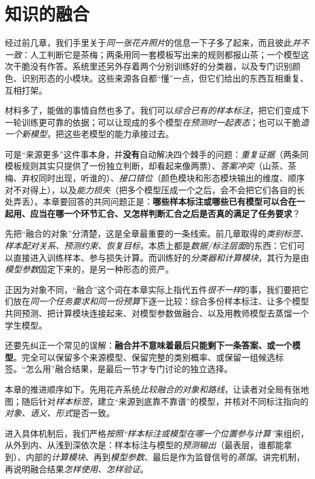 \chapter{知识的融合}
\label{chap:knowledge-fusion}

经过前几章，我们手里关于\emph{同一张花卉照片}的信息一下子多了起来，而且彼此\emph{并不一致}：人工判断它是茶梅；两条用同一套模板写出来的规则都报山茶；一个模型这次干脆没有作答。系统里还另外存着两个分别训练好的分类器，以及专门识别颜色、识别形态的小模块。这些来源各自都“懂”一点，但它们给出的东西互相重复、互相打架。

材料多了，能做的事情自然也多了。我们可以\emph{综合已有的样本标注}，把它们变成下一轮训练更可靠的依据；可以让现成的多个模型\emph{在预测时一起表态}；也可以干脆\emph{造一个新模型}，把这些老模型的能力承接过去。

可是“来源更多”这件事本身，并\textbf{没有}自动解决四个棘手的问题：\emph{重复证据}（两条同模板规则其实只提供了一份独立判断，却看起来像两票）、\emph{答案冲突}（山茶、茶梅、弃权同时出现，听谁的）、\emph{接口错位}（颜色模块和形态模块输出的维度、顺序对不对得上），以及\emph{能力损失}（把多个模型压成一个之后，会不会把它们各自的长处弄丢）。本章要回答的共同问题正是：\textbf{哪些样本标注或哪些已有模型可以合在一起用、应当在哪一个环节汇合、又怎样判断汇合之后是否真的满足了任务要求}？

先把“融合的对象”分清楚，这是全章最重要的一条线索。前几章取得的\emph{类别标签、样本配对关系、预测约束、恢复目标}，本质上都是\emph{数据/标注层面}的东西：它们可以直接进入训练样本、参与损失计算。而训练好的\emph{分类器和计算模块}，其行为是由\emph{模型参数}固定下来的，是另一种形态的资产。

正因为对象不同，“融合”这个词在本章实际上指代五件\emph{很不一样}的事，我们要把它们放在\emph{同一个任务要求和同一份预算}下逐一比较：综合多份样本标注、让多个模型共同预测、把计算模块连接起来、对模型参数做融合、以及用教师模型去蒸馏一个学生模型。

还要先纠正一个常见的误解：\textbf{融合并不意味着最后只能剩下一条答案、或一个模型}。完全可以保留多个来源模型、保留完整的类别概率、或保留一组候选标签。“怎么用”融合结果，是最后一节才专门讨论的独立选择。

本章的推进顺序如下。先用花卉系统\emph{比较融合的对象和路线}，让读者对全局有张地图；随后针对\emph{样本标签}，建立“来源到底靠不靠谱”的模型，并核对不同标注指向的\emph{对象、语义、形式}是否一致。

进入具体机制后，我们严格\emph{按照“样本标注或模型在哪一个位置参与计算”}来组织，从外到内、从浅到深依次是：样本标注与模型的\emph{预测输出}（最表层，谁都能拿到）、内部的\emph{计算模块}、再到\emph{模型参数}、最后是作为监督信号的\emph{蒸馏}。讲完机制，再说明融合结果\emph{怎样使用、怎样验证}。


